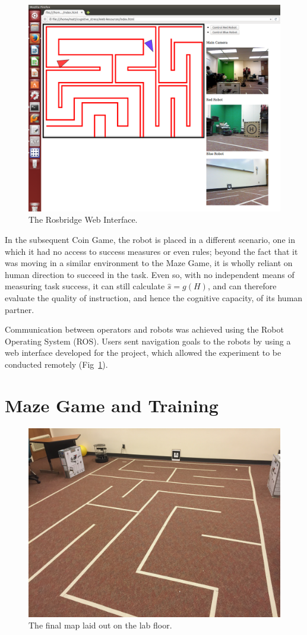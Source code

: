 \documentclass{sig-alternate}
\begin{document}
\begin{figure}
\includegraphics[width=.5\textwidth]{web-controller.png}
\caption{The Rosbridge Web Interface.}
\label{fig:web_interface_img}
\end{figure}

In the subsequent Coin Game, the robot is placed in a different
scenario, one in which it had no access to success measures or even
rules; beyond the fact that it was moving in a similar environment to
the Maze Game, it is wholly reliant on human direction to succeed in
the task.  Even so, with no independent means of measuring task
success, it can still calculate $\hat{s}=g(H)$, and can therefore
evaluate the quality of instruction, and hence the cognitive capacity,
of its human partner.

Communication between operators and robots was achieved using the
Robot Operating System (ROS)\cite{quigley2009ros}.  Users sent
navigation goals to the robots by using a web interface developed for
the project, which allowed the experiment to be conducted remotely
(Fig~\ref{fig:web_interface_img}).

\section{Maze Game and Training}
  

\begin{figure}
\centering 
\includegraphics[width=.5\textwidth]{tape_map.jpg} 
\caption{The final map laid out on the lab floor.}
\label{fig:map_floor_img}
\end{figure}
\end{document}
